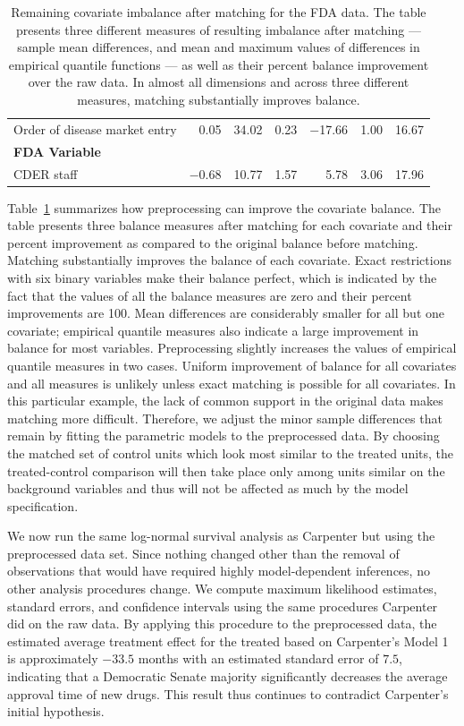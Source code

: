 \documentclass[11pt,titlepage]{article}
\begin{document}
\begin{table}[t]
\begin{center}
\begin{tabular}{lrrrrrr}
Order of disease market entry & 0.05 & 34.02 & 0.23 & $-$17.66 & 1.00 & 16.67 \\
{\bf FDA Variable} & \\
CDER staff & $-$0.68 & 10.77 & 1.57 & 5.78 & 3.06 & 17.96 \\
\hline
\hline
\end{tabular}
\end{center}
\caption{Remaining covariate imbalance after matching for the FDA data. 
  The table presents three different measures of resulting imbalance
  after matching --- sample mean differences, and mean and maximum
  values of differences in empirical quantile functions --- as well as
  their percent balance improvement over the raw data.  In almost all
  dimensions and across three different measures, matching
  substantially improves balance.} \label{tb:fdabal}
\end{table}

Table~\ref{tb:fdabal} summarizes how preprocessing can improve the
covariate balance. The table presents three balance measures after
matching for each covariate and their percent improvement as
compared to the original balance before matching.  Matching
substantially improves the balance of each covariate. Exact
restrictions with six binary variables make their balance perfect,
which is indicated by the fact that the values of all the balance
measures are zero and their percent improvements are 100.  Mean
differences are considerably smaller for all but one covariate;
empirical quantile measures also indicate a large improvement in
balance for most variables.  Preprocessing slightly increases the
values of empirical quantile measures in two cases.  Uniform
improvement of balance for all covariates and all measures is unlikely
unless exact matching is possible for all covariates. In this
particular example, the lack of common support in the original data
makes matching more difficult.  Therefore, we adjust the minor sample
differences that remain by fitting the parametric models to the
preprocessed data. By choosing the matched set of control units which
look most similar to the treated units, the treated-control comparison
will then take place only among units similar on the background
variables and thus will not be affected as much by the model
specification.

We now run the same log-normal survival analysis as Carpenter but
using the preprocessed data set.  Since nothing changed other than the
removal of observations that would have required highly
model-dependent inferences, no other analysis procedures change.  We
compute maximum likelihood estimates, standard errors, and confidence
intervals using the same procedures Carpenter did on the raw data.  By
applying this procedure to the preprocessed data, the estimated
average treatment effect for the treated based on Carpenter's Model 1
is approximately $-33.5$ months with an estimated standard error
of $7.5$, indicating that a Democratic Senate majority significantly
decreases the average approval time of new drugs.  This result thus
continues to contradict Carpenter's initial hypothesis.
\end{document}
